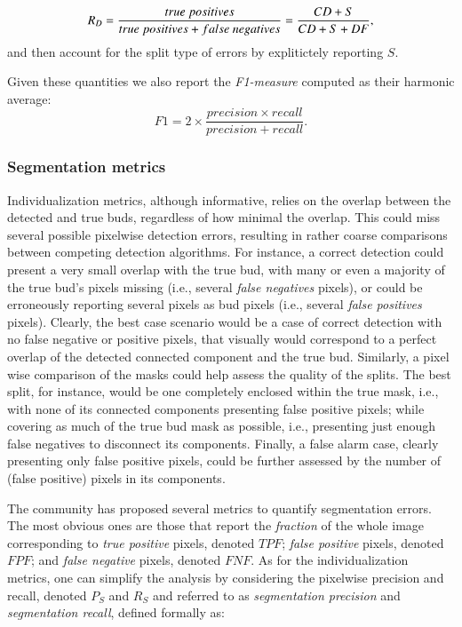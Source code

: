 \documentclass[a4paper,authoryear,review]{elsarticle}
\begin{document}
\begin{equation}
R_D = \frac{true\ positives}{true\ positives+false\ negatives} \\
= \frac{CD+S}{CD+S+DF},
\label{eq:detection-recall}
\end{equation}
and then account for the split type of errors by explitictely reporting $S$. 

Given these quantities we also report the \emph{F1-measure} computed as their harmonic average:
\[
F1 = 2 \times \frac{precision \times recall}{precision + recall}.
\] 


\subsubsection{Segmentation metrics} \label{subsec:segmetrics}

Individualization metrics, although informative, relies on  the overlap between the detected and true buds, regardless of how minimal the overlap. This could miss several possible pixelwise detection errors, resulting in rather coarse comparisons between competing detection algorithms. For instance, a correct detection could present a very small overlap with the true bud, with many or even a majority of the true bud’s pixels missing (i.e., several \emph{false negatives} pixels), or could be erroneously reporting several pixels as bud pixels (i.e., several \emph{false positives} pixels). Clearly, the best case scenario would be a case of correct detection with no false negative or positive pixels, that visually would correspond to a perfect overlap of the detected connected component and the true bud.  Similarly, a pixel wise comparison of the masks could help assess the quality of the splits. The best split, for instance, would be one completely enclosed within the true mask, i.e., with none of its connected components presenting false positive pixels; while covering as much of the true bud mask as possible, i.e., presenting just enough false negatives to disconnect its components. 
%
Finally, a false alarm case, clearly presenting only false positive pixels, could be further assessed by the number of (false positive) pixels in its components. 

The community has proposed several metrics to quantify segmentation errors. The most obvious ones are those that 
report the \emph{fraction} of the whole image corresponding to \emph{true positive} pixels, denoted $TPF$; \emph{false positive} pixels,  denoted $FPF$;  and \emph{false negative} pixels, denoted $FNF$. 
%
As for the individualization metrics, one can simplify the analysis by considering the  pixelwise precision and recall, denoted $P_S$ and $R_S$ and referred to as \emph{segmentation precision}  and \emph{segmentation recall}, defined formally as: 
\end{document}
